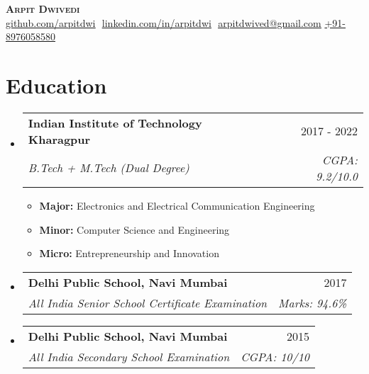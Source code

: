\documentclass[letterpaper,11pt]{article}
\makeatletter
\newcommand{\resumeItem}[1]{
  \item\small{
    {#1 \vspace{-2pt}}
  }
}
\newcommand{\resumeSubheading}[4]{
  \vspace{-2pt}\item
    \begin{tabular*}{0.97\textwidth}[t]{l@{\extracolsep{\fill}}r}
      \textbf{#1} & #2 \\
      \textit{\small#3} & \textit{\small #4} \\
    \end{tabular*}\vspace{-7pt}
}
\newcommand{\resumeSubHeadingListStart}{\begin{itemize}[leftmargin=0.15in, label={}]}
\newcommand{\resumeSubHeadingListEnd}{\end{itemize}}
\newcommand{\resumeItemListStart}{\begin{itemize}}
\newcommand{\resumeItemListEnd}{\end{itemize}\vspace{-5pt}}
\makeatother
\begin{document}

\vspace{-5pt}

\begin{center}
    \textbf{\Huge \scshape Arpit Dwivedi} \\ \vspace{8pt}
    \small 
    \href{https://github.com/arpitdwi}{\underline{github.com/arpitdwi}} $  $
    \href{https://linkedin.com/in/arpitdwi}{\underline{linkedin.com/in/arpitdwi}} $  $
    \href{mailto:arpitdwived@gmail.com}
    {\underline{arpitdwived@gmail.com}}
    {\underline{+91-8976058580}}
\end{center}

\vspace{-5pt}
\section{Education}
  \resumeSubHeadingListStart
  
    \resumeSubheading
      {Indian Institute of Technology Kharagpur}{2017 - 2022}
      {B.Tech + M.Tech (Dual Degree)}{CGPA: 9.2/10.0}
      \resumeItemListStart
      \resumeItem{\textbf{Major:} Electronics and Electrical Communication Engineering}
      \resumeItem{\textbf{Minor:} Computer Science and Engineering}
      \resumeItem{\textbf{Micro:} Entrepreneurship and Innovation}
      \resumeItemListEnd
      
      
\vspace{5pt}      

    \resumeSubheading
      {Delhi Public School, Navi Mumbai}{2017}
      {All India Senior School Certificate Examination}{Marks: 94.6\%}
      
\vspace{5pt}

    \resumeSubheading
      {Delhi Public School, Navi Mumbai}{2015}
      {All India Secondary School Examination}{CGPA: 10/10}

  \resumeSubHeadingListEnd

\vspace{-5pt}
\end{document}
